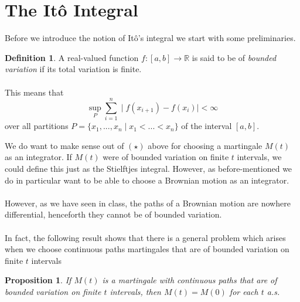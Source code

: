\documentclass[11pt,a4paper, final]{article}
\newtheorem{prop}{Proposition}[section]
\theoremstyle{definition}
\newtheorem{defn}{Definition}[section]
\begin{document}
\section{The Itô Integral}
Before we introduce the notion of Itô's integral we start with some preliminaries.
\begin{defn}
A real-valued function $f: [a,b] \rightarrow \mathbb{R}$ is said to be of \textit{bounded variation} if its total variation is finite.\\
\\ This means that 
$$ \sup_P \sum \limits_{i=1}^n \mid f(x_{i+1})-f(x_i)\mid < \infty $$
over all partitions $P = \{x_1, ..., x_n \mid x_1<...<x_n\}$ of the interval $[a,b]$.
\end{defn}

\noindent We do want to make sense out of $(\star)$ above for choosing a martingale $M(t)$ as an integrator. If $M(t)$ were of bounded variation on finite $t$ intervals, we could define this just as the Stielftjes integral. However, as before-mentioned we do in particular want to be able to choose a Brownian motion as an integrator. 
\\\\
However, as we have seen in class, the paths of a Brownian motion are nowhere differential, henceforth they cannot be of bounded variation. \\
\\
In fact, the following result shows that there is a general problem which arises when we choose continuous paths martingales that are of bounded variation on finite $t$ intervals
\begin{prop}  \label{first Prop}
If $M(t)$ is a martingale with continuous paths that are of bounded variation on finite $t$ intervals, then $M(t) = M(0)$ for each $t$ a.s.
\end{prop}
\end{document}
